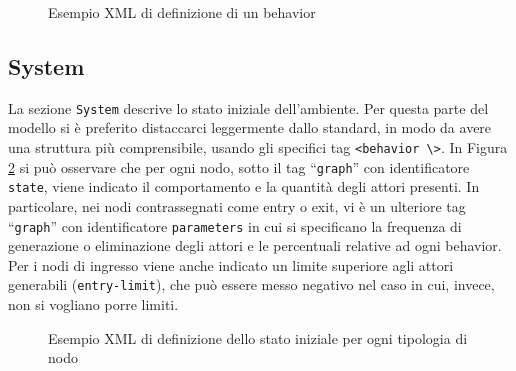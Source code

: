 \begin{figure}[htbp]
\centering
\caption{Esempio XML di definizione di un behavior}
\label{fig:xml-behaviors}
\end{figure}

\subsection{System}

La sezione \texttt{System} descrive lo stato iniziale dell'ambiente. Per questa parte del modello si è preferito distaccarci leggermente dallo standard, in modo da avere una struttura più comprensibile, usando gli specifici tag \texttt{<behavior \textbackslash>}. In Figura \ref{fig:xml-system} si può osservare che per ogni nodo, sotto il tag “\texttt{graph}” con identificatore \texttt{state}, viene indicato il comportamento e la quantità degli attori presenti. In particolare, nei nodi contrassegnati come entry o exit, vi è un ulteriore tag “\texttt{graph}” con identificatore \texttt{parameters} in cui si specificano la frequenza di generazione o eliminazione degli attori e le percentuali relative ad ogni behavior. Per i nodi di ingresso viene anche indicato un limite superiore agli attori generabili (\texttt{entry-limit}), che può essere messo negativo nel caso in cui, invece, non si vogliano porre limiti.

\begin{figure}[htbp]
\centering
\caption{Esempio XML di definizione dello stato iniziale per ogni tipologia di nodo}
\label{fig:xml-system}
\end{figure}

